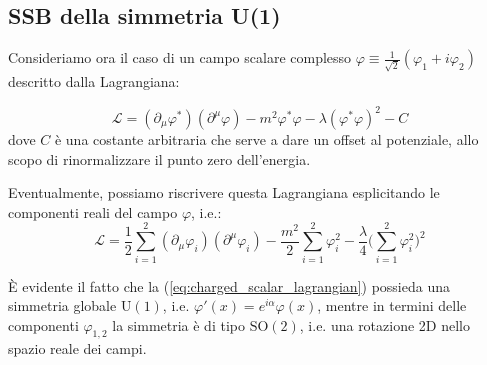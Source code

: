 \documentclass[../main.tex]{subfiles}
\begin{document}
\subsection{SSB della simmetria U(1)}

Consideriamo ora il caso di un campo scalare complesso $\varphi \equiv \frac{1}{\sqrt{2}}(\varphi_1+i\varphi_2)$ descritto dalla Lagrangiana:

\begin{equation}
    \boxed{\mathscr{L} = (\partial_\mu\varphi^\ast)(\partial^\mu\varphi) - m^2\varphi^\ast\varphi - \lambda(\varphi^\ast\varphi)^2 - C}
    \label{eq:charged_scalar_lagrangian}
\end{equation}
dove $C$ è una costante arbitraria che serve a dare un offset al potenziale, allo scopo di rinormalizzare il punto zero dell'energia.

Eventualmente, possiamo riscrivere questa Lagrangiana esplicitando le componenti reali del campo $\varphi$, i.e.:
\[
\mathscr{L} = \frac{1}{2}\sum_{i=1}^2(\partial_\mu\varphi_i)(\partial^\mu\varphi_i) - \frac{m^2}{2}\sum_{i=1}^2\varphi_i^2 - \frac{\lambda}{4}\bigg(\sum_{i=1}^2\varphi_i^2\bigg)^2
\]

È evidente il fatto che la (\ref{eq:charged_scalar_lagrangian}) possieda una simmetria globale $\textrm{U}(1)$, i.e. $\varphi'(x)=e^{i\alpha}\varphi(x)$, mentre in termini delle componenti $\varphi_{1,2}$ la simmetria è di tipo $\textrm{SO}(2)$, i.e. una rotazione 2D nello spazio reale dei campi.
\end{document}
